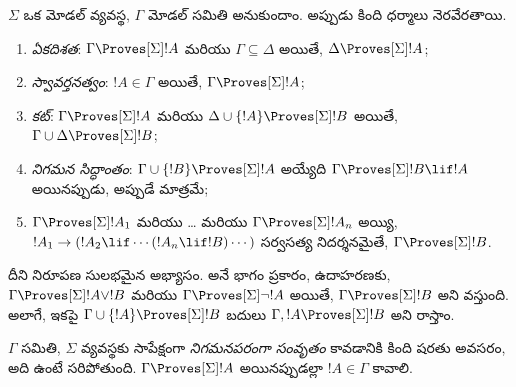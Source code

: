 \documentclass[../../../include/open-logic-section]{subfiles}
\begin{document}


\begin{prop}
  $\Sigma$ ఒక మోడల్ వ్యవస్థ, $\Gamma$ మోడల్
   సమితి అనుకుందాం. అప్పుడు కింది ధర్మాలు నెరవేరతాయి.
  \begin{enumerate}
  \item{} \emph{ఏకదిశత}:
    $\Gamma \Proves[\Sigma] !A$ మరియు $\Gamma \subseteq \Delta$ అయితే,
    $\Delta \Proves[\Sigma] !A$;
  \item{}
    \emph{స్వావర్తనత్వం}: $!A \in \Gamma$ అయితే, $\Gamma
    \Proves[\Sigma] !A$;
  \item{} \emph{కట్}: $\Gamma
    \Proves[\Sigma] !A$ మరియు $\Delta \cup \{!A\} \Proves[\Sigma] !B$
    అయితే, $\Gamma \cup \Delta \Proves[\Sigma] !B$;
  \item{} \emph{నిగమన సిద్ధాంతం}:
    $\Gamma \cup \{!B\} \Proves[\Sigma] !A$ అయ్యేది
    $\Gamma \Proves[\Sigma] !B \lif !A$ అయినప్పుడు, అప్పుడే మాత్రమే;
  \item {}%
    $\Gamma \Proves[\Sigma] !A_1$ మరియు \dots{} మరియు $\Gamma
    \Proves[\Sigma] !A_n$ అయ్యి, $!A_1 \to (!A_2 \lif \cdots (!A_n \lif
    !B)\cdots)$ సర్వసత్య నిదర్శనమైతే, $\Gamma
    \Proves[\Sigma] !B$.
  \end{enumerate}
\end{prop}

దీని నిరూపణ సులభమైన అభ్యాసం. 
అనే  భాగం ప్రకారం, ఉదాహరణకు,
$\Gamma \Proves[\Sigma] !A \lor !B$ మరియు
$\Gamma \Proves[\Sigma] \lnot !A$ అయితే,
$\Gamma \Proves[\Sigma] !B$ అని వస్తుంది. అలాగే, ఇకపై
$\Gamma \cup \{ !A\} \Proves[\Sigma] !B$ బదులు
$\Gamma, !A \Proves[\Sigma] !B$ అని రాస్తాం.

\begin{defn}
  $\Gamma$ సమితి, $\Sigma$ వ్యవస్థకు సాపేక్షంగా
  \emph{నిగమనపరంగా సంవృతం} కావడానికి కింది షరతు అవసరం, అది ఉంటే సరిపోతుంది.
  $\Gamma \Proves[\Sigma] !A$ అయినప్పుడల్లా $!A \in \Gamma$
  కావాలి.
\end{defn}
\end{document}
